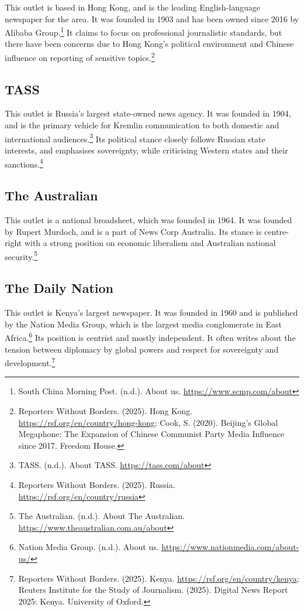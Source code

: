 This outlet is based in Hong Kong, and is the leading English-language newspaper for the area. It was founded in 1903 and has been owned since 2016 by Alibaba Group.\footnote{South China Morning Post. (n.d.). About us. \url{https://www.scmp.com/about}} It claims to focus on professional journalistic standards, but there have been concerns due to Hong Kong’s political environment and Chinese influence on reporting of sensitive topics.\footnote{Reporters Without Borders. (2025). Hong Kong. \url{https://rsf.org/en/country/hong-kong}; Cook, S. (2020). Beijing's Global Megaphone: The Expansion of Chinese Communist Party Media Influence since 2017. Freedom House.}

\subsection{TASS}

This outlet is Russia’s largest state-owned news agency. It was founded in 1904, and is the primary vehicle for Kremlin communication to both domestic and international audiences.\footnote{TASS. (n.d.). About TASS. \url{https://tass.com/about}} Its political stance closely follows Russian state interests, and emphasises sovereignty, while criticising Western states and their sanctions.\footnote{Reporters Without Borders. (2025). Russia. \url{https://rsf.org/en/country/russia}}

\subsection{The Australian}

This outlet is a national broadsheet, which was founded in 1964. It was founded by Rupert Murdoch, and is a part of News Corp Australia. Its stance is centre-right with a strong position on economic liberalism and Australian national security.\footnote{The Australian. (n.d.). About The Australian. \url{https://www.theaustralian.com.au/about}}

\subsection{The Daily Nation}

This outlet is Kenya’s largest newspaper. It was founded in 1960 and is published by the Nation Media Group, which is the largest media conglomerate in East Africa.\footnote{Nation Media Group. (n.d.). About us. \url{https://www.nationmedia.com/about-us/}} Its position is centrist and mostly independent. It often writes about the tension between diplomacy by global powers and respect for sovereignty and development.\footnote{Reporters Without Borders. (2025). Kenya. \url{https://rsf.org/en/country/kenya}; Reuters Institute for the Study of Journalism. (2025). Digital News Report 2025: Kenya. University of Oxford.}

